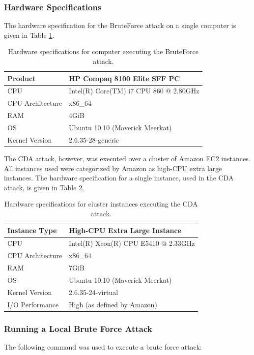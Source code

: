 \documentclass[pdftex,english,10pt,b5paper,twoside]{book}
\begin{document}
\subsubsection{Hardware Specifications}
The hardware specification for the BruteForce attack on a single computer is
given in Table \ref{tab:hwbf}.
\begin{table}[!h]
    \centering
    \caption{Hardware specifications for computer executing the BruteForce
    attack.}
    \label{tab:hwbf}
    \begin{tabular}{| l | l |}
	\hline
	Product		    &HP Compaq 8100 Elite SFF PC \\
	\hline
	CPU		    &Intel(R) Core(TM) i7 CPU 860 @ 2.80GHz\\
	\hline
	CPU Architecture    &x86\_64\\
	\hline
	RAM		    &4GiB\\
	\hline
	OS		    &Ubuntu 10.10 (Maverick Meerkat)\\
	\hline
	Kernel Version	    &2.6.35-28-generic\\
	\hline
    \end{tabular}
\end{table}

\noindent The CDA attack, however, was executed over a cluster of Amazon \ac{EC2}
instances. All instances used were categorized by Amazon as high-CPU extra large
instances. The hardware specification for a single instance, used in the CDA
attack, is given in Table \ref{tab:hwcda}.

    \begin{table}[!h]
    \centering
    \caption{Hardware specifications for cluster instances executing the CDA
    attack.}
    \label{tab:hwcda}
    \begin{tabular}{| l | l |}
	\hline
	Instance Type	    &High-CPU Extra Large Instance\\
	\hline
	CPU		    &Intel(R) Xeon(R) CPU E5410 @ 2.33GHz\\
	\hline
	CPU Architecture    &x86\_64\\
	\hline
	RAM		    &7GiB\\
	\hline
	OS		    &Ubuntu 10.10 (Maverick Meerkat)\\
	\hline
	Kernel Version	    &2.6.35-24-virtual\\
	\hline
	I/O Performance	    &High (as defined by Amazon)\\
	\hline
    \end{tabular}
\end{table}
\subsubsection{Running a Local Brute Force Attack}
The following command was used to execute a brute force
attack:
\end{document}
